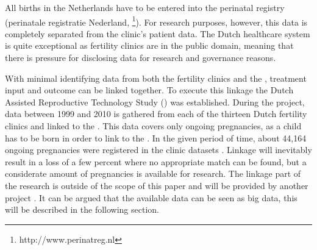 All births in the Netherlands have to be entered into the perinatal registry (perinatale registratie Nederland, \PRN{}\footnote{http://www.perinatreg.nl}).
For research purposes, however, this data is completely separated from the clinic's patient data.
The Dutch healthcare system is quite exceptional as fertility clinics are in the public domain, 
meaning that there is pressure for disclosing  data for research and governance reasons.

With minimal identifying data from both the fertility clinics and the \PRN{}, treatment input and outcome can be linked together.
To execute this linkage the Dutch Assisted Reproductive Technology Study (\project{}) was established.
During the project, data between 1999 and 2010 is gathered from each of the thirteen Dutch fertility clinics and linked to the \PRN{}.
This data covers only ongoing pregnancies, as a child has to be born in order to link to the \PRN{}.
In the given period of time, about 44,164 ongoing pregnancies were registered in the clinic datasets \cite{ivfReportNVOG}.
Linkage will inevitably result in a loss of a few percent where no appropriate match can be found, 
but a considerate amount of pregnancies is available for research.
The linkage part of the research is outside of the scope of this paper and will be provided by another project \cite{}.
It can be argued that the available data can be seen as big data, this will be described in the following section.
